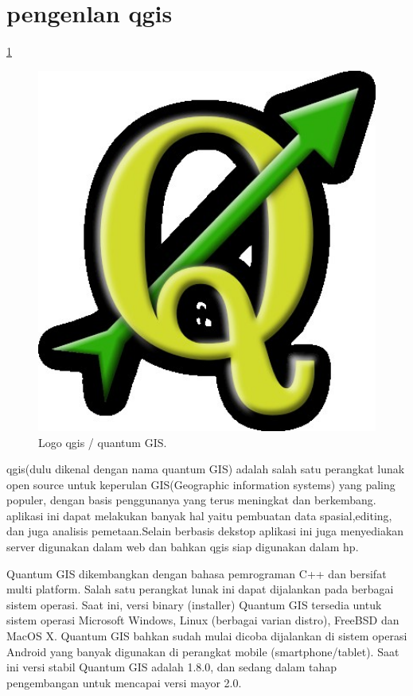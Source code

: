 
\section{pengenlan qgis}
	\ref{qgis_logo}
	\begin{figure}[ht]
	\centerline{\includegraphics[width=1\textwidth]{figures/qgis_logo.JPG}}
	\caption{Logo qgis / quantum GIS.}
	\label{qgis_logo}
	\end{figure}
	  qgis(dulu dikenal dengan nama quantum GIS) adalah salah satu perangkat lunak open source untuk keperulan GIS(Geographic information systems) yang paling populer, dengan basis penggunanya yang terus meningkat dan berkembang.
	 aplikasi ini dapat melakukan banyak hal yaitu pembuatan data spasial,editing, dan juga analisis pemetaan.Selain berbasis dekstop aplikasi ini juga menyediakan server digunakan dalam web dan bahkan qgis siap digunakan dalam hp.

	Quantum GIS dikembangkan dengan bahasa pemrograman C++ dan bersifat multi platform. Salah satu perangkat lunak ini dapat dijalankan pada berbagai sistem operasi. Saat ini, versi binary (installer) Quantum GIS tersedia untuk sistem operasi Microsoft Windows, Linux (berbagai varian distro), FreeBSD dan MacOS X. Quantum GIS bahkan sudah mulai dicoba dijalankan di sistem operasi Android yang banyak digunakan di perangkat mobile (smartphone/tablet). Saat ini versi stabil Quantum GIS adalah 1.8.0, dan sedang dalam tahap pengembangan untuk mencapai versi mayor 2.0.

